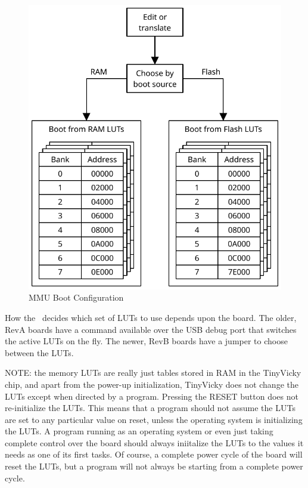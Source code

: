 \begin{figure}[h]
    \begin{center}
        \includegraphics{images/MemoryLUTSelection.pdf}
    \end{center}
    \caption{MMU Boot Configuration}
    \label{fig:lut_choice}
\end{figure}

How the \jr\ decides which set of LUTs to use depends upon the board. The older, RevA boards have a command available over the USB debug port that switches the active LUTs on the fly. The newer, RevB boards have a jumper to choose between the LUTs.

NOTE: the memory LUTs are really just tables stored in RAM in the TinyVicky chip, and apart from the power-up initialization, TinyVicky does not change the LUTs except when directed by a program. Pressing the RESET button does not re-initialize the LUTs. This means that a program should not assume the LUTs are set to any particular value on reset, unless the operating system is initializing the LUTs. A program running as an operating system or even just taking complete control over the board should always iniitalize the LUTs to the values it needs as one of its first tasks. Of course, a complete power cycle of the board will reset the LUTs, but a program will not always be starting from a complete power cycle.
